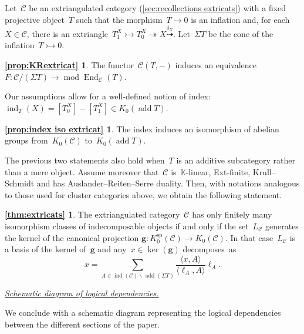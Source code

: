 \documentclass{amsart}
\theoremstyle{definition}
\renewcommand{\b}[1]{{\boldsymbol{#1}}} %
\newcommand{\ssm}{\smallsetminus} %
\newcommand{\para}[1]{\medskip\noindent\uline{\textit{#1.}}} %
\newcommand{\field}{\mathbb{K}}
\newcommand{\cat}{\mathcal{C}}
\newcommand{\susp}{\Sigma}
\newcommand{\add}{\operatorname{add}}
\newcommand{\MOD}{\operatorname{mod}}
\newcommand{\End}[1]{\operatorname{End}_{#1}}
\newcommand{\spl}{\operatorname{sp}}
\newcommand{\Ksp}{K_0^{\spl}}
\newcommand{\ind}{\operatorname{ind}}
\newcommand{\infl}{\rightarrowtail}
\newcommand{\defl}{\twoheadrightarrow}
\newcommand{\kzero}[1]{K_0(#1)}
\begin{document}
Let~$\cat$ be an extriangulated category (\cref{sec:recollections extricats}) with a fixed projective object~$T$ such that the morphism~$T\to 0$ is an inflation and, for each~$X\in\cat$, there is an extriangle~$T_1^X\infl T_0^X\defl X\overset{\delta_X}{\dashrightarrow}$.
Let~$\susp T$ be the cone of the inflation~$T\infl 0$.

\newtheorem*{prop:KRextricat}{\cref{prop:KRextricat}}
\begin{prop:KRextricat}
The functor~$\cat(T,-)$ induces an equivalence~$F:\cat/(\susp T) \to \MOD \End{\cat}(T)$.
\end{prop:KRextricat}

Our assumptions allow for a well-defined notion of index:~$\ind_T(X)=[T_0^X]-[T_1^X] \in \kzero{\add T}$.

\newtheorem*{prop:index iso extricat}{\cref{prop:index iso extricat}}
\begin{prop:index iso extricat}
The index induces an isomorphism of abelian groups from~$\kzero{\cat}$ to~$\kzero{\add T}$.
\end{prop:index iso extricat}

The previous two statements also hold when~$T$ is an additive subcategory rather than a mere object.
Assume moreover that~$\cat$ is~$\field$-linear, Ext-finite, Krull--Schmidt and has Auslander--Reiten--Serre duality.
Then, with notations analogous to those used for cluster categories above, we obtain the following statement.

\newtheorem*{thm:extricats}{\cref{thm:extricats}}
\begin{thm:extricats}
The extriangulated category~$\cat$ has only finitely many isomorphism classes of indecomposable objects if and only if the set~$L_\cat$ generates the kernel of the canonical projection ${\b{g}:\Ksp(\cat)\to\kzero{\cat}}$.
In that case~$L_\cat$ is a basis of the kernel of~$\b{g}$ and any~$x\in\ker(\b{g})$ decomposes~as
\[
 x = \sum_{A \in \ind(\cat) \ssm \add(\susp T)} \frac{\langle x, A \rangle}{\langle \ell_A, A \rangle} \ell_A.
\]
\end{thm:extricats}

\para{Schematic diagram of logical dependencies}

\noindent
We conclude with a schematic diagram representing the logical dependencies between the different sections of the paper.
\end{document}
